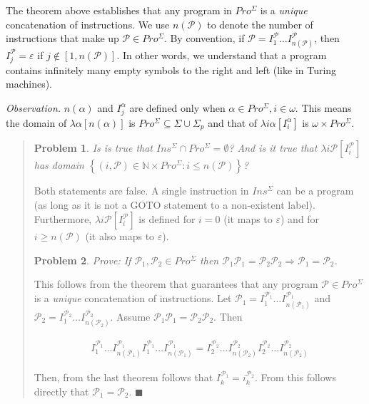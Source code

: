 \documentclass[a4paper, 12pt]{article}
\newtheorem{problem}{Problem}
\newtheorem{problem}{Problem}
\begin{document}
The theorem above establishes that any program in $Pro^{\Sigma}$ is a
\textit{unique} concatenation of instructions. We use $n(\mathcal{P})$ to denote
the number of instructions that make up $\mathcal{P} \in Pro^{\Sigma}$. By
convention, if $\mathcal{P} = I^{\mathcal{P}}_1 \ldots
I^{\mathcal{P}}_{n(\mathcal{P})}$, then $I^{\mathcal{P}}_j =
\varepsilon$ if $j \not\in [1, n(\mathcal{P})]$. In other words, we understand that
a program contains infinitely many empty symbols to the right and left (like in
Turing machines).

\textit{Observation.} $n(\alpha)$ and $I_j^{\alpha}$ are defined only when
$\alpha \in Pro^{\Sigma}, i \in \omega$. This means the domain of $\lambda
\alpha[n(\alpha)]$ is $Pro^{\Sigma} \subseteq \Sigma \cup \Sigma_p$ and that of
$\lambda i\alpha[I_i^{\alpha}]$ is $\omega \times Pro^{\Sigma}$.


\small
\begin{quote}


\begin{problem}
    Is is true that $Ins^{\Sigma} \cap Pro^{\Sigma} = \emptyset$? And is it true
    that $\lambda i \mathcal{P} [I_i^{\mathcal{P}}]$ has domain $\left\{ (i,
    \mathcal{P}) \in \mathbb{N} \times Pro^{\Sigma}: i \leq n(\mathcal{P})
\right\} $?
\end{problem}

Both statements are false. A single instruction in $Ins^{\Sigma}$ can be a
program (as long as it is not a GOTO statement to a non-existent label).
Furthermore, $\lambda i \mathcal{P} [I_i^{\mathcal{P}}]$ is defined for $i = 0$
(it maps to $\varepsilon$) and for $i \geq n(\mathcal{P} )$ (it also maps to
$\varepsilon$).

\begin{problem}
    Prove: If $\mathcal{P}_1, \mathcal{P}_2 \in Pro^{\Sigma}$ then $\mathcal{P}_1
    \mathcal{P}_1 = \mathcal{P}_2 \mathcal{P}_2 \Rightarrow \mathcal{P}_1 =
    \mathcal{P}_2$.
\end{problem}

This follows from the theorem that guarantees that any program $\mathcal{P} \in
Pro^{\Sigma}$ is a \textit{unique} concatenation of instructions. Let
$\mathcal{P}_1 = I_1^{\mathcal{P}_1} \ldots I_{n(\mathcal{P}_1)}^{\mathcal{P}_1}$ and $\mathcal{P}_2 = I_1^{\mathcal{P}_2}
\ldots I_{n(\mathcal{P}_2)}^{\mathcal{P}_2}$. Assume $\mathcal{P}_1\mathcal{P}_1 =
\mathcal{P}_2 \mathcal{P}_2$. Then 

\begin{align*}
    I_1^{\mathcal{P}_1} \ldots I_{n(\mathcal{P}_1)}^{\mathcal{P}_1}
    I_1^{\mathcal{P}_1} \ldots I_{n(\mathcal{P}_1)}^{\mathcal{P}_1} = 
    I_2^{\mathcal{P}_2} \ldots I_{n(\mathcal{P}_2)}^{\mathcal{P}_2}
    I_2^{\mathcal{P}_2} \ldots I_{n(\mathcal{P}_2)}^{\mathcal{P}_2}
\end{align*}

Then, from the last theorem follows that $I_k^{\mathcal{P}_1} =
i_k^{\mathcal{P}_2}$. From this follows directly that $\mathcal{P}_1 =
\mathcal{P}_2$. $\blacksquare$

\end{quote}
\normalsize
\end{document}
